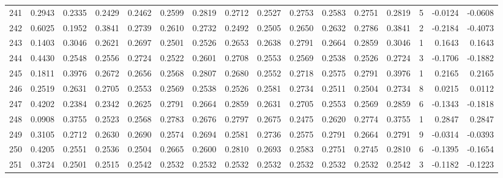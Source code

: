 \begin{tabular}{lrrrrrrrrrrrrrrr}
241 &      0.2943 &  0.2335 &  0.2429 &  0.2462 &  0.2599 &  0.2819 &  0.2712 &  0.2527 &  0.2753 &  0.2583 &   0.2751 &     0.2819 &      5 &                   -0.0124 &                    -0.0608 \\
242 &      0.6025 &  0.1952 &  0.3841 &  0.2739 &  0.2610 &  0.2732 &  0.2492 &  0.2505 &  0.2650 &  0.2632 &   0.2786 &     0.3841 &      2 &                   -0.2184 &                    -0.4073 \\
243 &      0.1403 &  0.3046 &  0.2621 &  0.2697 &  0.2501 &  0.2526 &  0.2653 &  0.2638 &  0.2791 &  0.2664 &   0.2859 &     0.3046 &      1 &                    0.1643 &                     0.1643 \\
244 &      0.4430 &  0.2548 &  0.2556 &  0.2724 &  0.2522 &  0.2601 &  0.2708 &  0.2553 &  0.2569 &  0.2538 &   0.2526 &     0.2724 &      3 &                   -0.1706 &                    -0.1882 \\
245 &      0.1811 &  0.3976 &  0.2672 &  0.2656 &  0.2568 &  0.2807 &  0.2680 &  0.2552 &  0.2718 &  0.2575 &   0.2791 &     0.3976 &      1 &                    0.2165 &                     0.2165 \\
246 &      0.2519 &  0.2631 &  0.2705 &  0.2553 &  0.2569 &  0.2538 &  0.2526 &  0.2581 &  0.2734 &  0.2511 &   0.2504 &     0.2734 &      8 &                    0.0215 &                     0.0112 \\
247 &      0.4202 &  0.2384 &  0.2342 &  0.2625 &  0.2791 &  0.2664 &  0.2859 &  0.2631 &  0.2705 &  0.2553 &   0.2569 &     0.2859 &      6 &                   -0.1343 &                    -0.1818 \\
248 &      0.0908 &  0.3755 &  0.2523 &  0.2568 &  0.2783 &  0.2676 &  0.2797 &  0.2675 &  0.2475 &  0.2620 &   0.2774 &     0.3755 &      1 &                    0.2847 &                     0.2847 \\
249 &      0.3105 &  0.2712 &  0.2630 &  0.2690 &  0.2574 &  0.2694 &  0.2581 &  0.2736 &  0.2575 &  0.2791 &   0.2664 &     0.2791 &      9 &                   -0.0314 &                    -0.0393 \\
250 &      0.4205 &  0.2551 &  0.2536 &  0.2504 &  0.2665 &  0.2600 &  0.2810 &  0.2693 &  0.2583 &  0.2751 &   0.2745 &     0.2810 &      6 &                   -0.1395 &                    -0.1654 \\
251 &      0.3724 &  0.2501 &  0.2515 &  0.2542 &  0.2532 &  0.2532 &  0.2532 &  0.2532 &  0.2532 &  0.2532 &   0.2532 &     0.2542 &      3 &                   -0.1182 &                    -0.1223 \\

\end{tabular}
